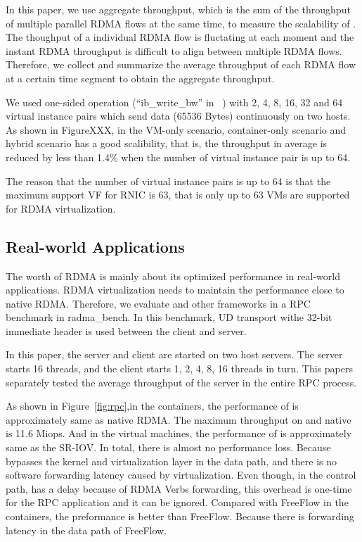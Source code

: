 In this paper, we use aggregate throughput, which is the sum of the throughput of multiple parallel RDMA flows at the same time, to measure the scalability of \sys. The thoughput of a individual RDMA flow is fluctating at each moment and the instant RDMA throughput is difficult to align between multiple RDMA flows. Therefore, we collect and summarize the average throughput of each RDMA flow at a certain time segment to obtain the aggregate throughput.

We used one-sided operation (``ib\_write\_bw'' in ~\cite{perftest}) with 2, 4, 8, 16, 32 and 64 virtual instance pairs which send data (65536 Bytes) continuously on two hosts. As shown in FigureXXX, in the VM-only scenario, container-only scenario and hybrid scenario \sys has a good scalibility, that is, the throughput in average is reduced by less than 1.4\% when the number of virtual instance pair is up to 64.

The reason that the number of virtual instance pairs is up to 64 is that the maximum support VF for RNIC is 63, that is only up to 63 VMs are supported for RDMA virtualization.

\subsection{Real-world Applications}

The worth of RDMA is mainly about its optimized performance in real-world applications. RDMA virtualization needs to maintain the performance close to native RDMA. Therefore, we evaluate \sys and other frameworks in a RPC benchmark in radma\_bench\cite{rbench}. In this benchmark, UD transport withe 32-bit immediate header is used between the client and server.

In this paper, the server and client are started on two host servers. The server starts 16 threads, and the client starts 1, 2, 4, 8, 16 threads in turn. This papers separately tested the average throughput of the server in the entire RPC process.

As shown in Figure~\ref{fig:rpc},in the containers, the performance of \sys is approximately same as native RDMA. The
maximum throughput on \sys and native is 11.6 Miops. And in the virtual machines, the performance of \sys is approximately same as the SR-IOV. In total, there is almost no performance loss. Because \sys bypasses the kernel and virtualization layer in the data path, and there is no software forwarding latency caused by virtualization. Even though, in the control path, \sys has a delay because of RDMA Verbs forwarding, this overhead is one-time for the RPC application and it can be ignored. Compared with FreeFlow in the containers, the preformance \sys is better than FreeFlow. Because there is forwarding latency in the data path of FreeFlow.

